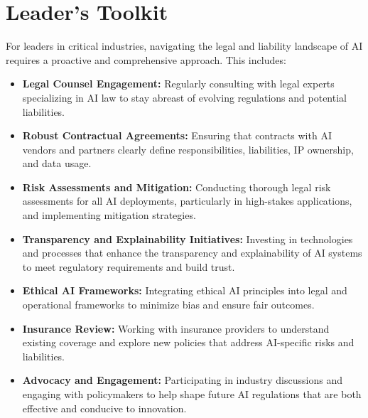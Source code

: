 \section{Leader's Toolkit}
\label{sec:legal_leaders_toolkit}
For leaders in critical industries, navigating the legal and liability landscape of AI requires a proactive and comprehensive approach. This includes:
\begin{itemize}
    \item \textbf{Legal Counsel Engagement:} Regularly consulting with legal experts specializing in AI law to stay abreast of evolving regulations and potential liabilities.
    \item \textbf{Robust Contractual Agreements:} Ensuring that contracts with AI vendors and partners clearly define responsibilities, liabilities, IP ownership, and data usage.
    \item \textbf{Risk Assessments and Mitigation:} Conducting thorough legal risk assessments for all AI deployments, particularly in high-stakes applications, and implementing mitigation strategies.
    \item \textbf{Transparency and Explainability Initiatives:} Investing in technologies and processes that enhance the transparency and explainability of AI systems to meet regulatory requirements and build trust.
    \item \textbf{Ethical AI Frameworks:} Integrating ethical AI principles into legal and operational frameworks to minimize bias and ensure fair outcomes.
    \item \textbf{Insurance Review:} Working with insurance providers to understand existing coverage and explore new policies that address AI-specific risks and liabilities.
    \item \textbf{Advocacy and Engagement:} Participating in industry discussions and engaging with policymakers to help shape future AI regulations that are both effective and conducive to innovation.
\end{itemize}